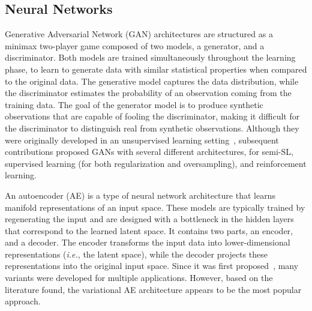 \subsection{Neural Networks}

Generative Adversarial Network (GAN) architectures are structured as a minimax
two-player game composed of two models, a generator, and a discriminator. Both
models are trained simultaneously throughout the learning phase, to learn to
generate data with similar statistical properties when compared to the
original data. The generative model captures the data distribution, while the
discriminator estimates the probability of an observation coming from the
training data. The goal of the generator model is to produce synthetic
observations that are capable of fooling the discriminator, making it
difficult for the discriminator to distinguish real from synthetic
observations. Although they were originally developed in an unsupervised
learning setting~\cite{goodfellow2020generative}, subsequent contributions
proposed GANs with several different architectures, for semi-SL, supervised
learning (for both regularization and oversampling), and reinforcement
learning.

An autoencoder (AE) is a type of neural network architecture that learns
manifold representations of an input space. These models are typically trained
by regenerating the input and are designed with a bottleneck in the hidden
layers that correspond to the learned latent space. It contains two parts,
an encoder, and a decoder. The encoder transforms the input data into
lower-dimensional representations (\textit{i.e.}, the latent space), while
the decoder projects these representations into the original input space.
Since it was first proposed~\cite{ackley1985learning}, many variants were
developed for multiple applications. However, based on the literature found,
the variational AE architecture appears to be the most popular approach.

